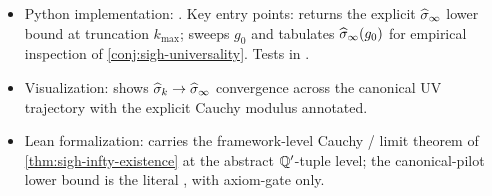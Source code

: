 \begin{itemize}
  \item Python implementation:
    .  Key entry points:
     returns the
    explicit $\widehat{\sigma}_\infty$ lower bound at truncation $k_{\max}$;
    sweeps $g_0$ and tabulates $\widehat{\sigma}_\infty(g_0)$ for empirical
    inspection of \cref{conj:sigh-universality}.  Tests in
    .
  \item Visualization:
     shows
    $\widehat{\sigma}_k \to \widehat{\sigma}_\infty$ convergence across the canonical UV
    trajectory with the explicit Cauchy modulus annotated.
  \item Lean formalization:
     carries the
    framework-level Cauchy / limit theorem of
    \cref{thm:sigh-infty-existence} at the abstract $\mathbb{Q}'$-tuple
    level; the canonical-pilot lower bound is the literal
    , with axiom-gate
    \codepath{[propext]} only.
\end{itemize}
